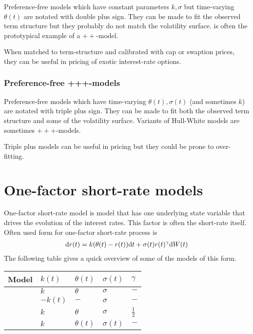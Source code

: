 Preference-free models which have constant parameters $k, \sigma$ but time-varying $\theta(t)$ are notated with double plus sign. They can be made to fit  the observed term structure but they probably do not match the volatility surface. \textcite{hull1990pricing} is often the prototypical example of a $++$-model.

When matched to term-structure and calibrated with cap or swaption prices, they can be useful in pricing of exotic interest-rate options.

\subsubsection{Preference-free +++-models}

Preference-free models which have time-varying $\theta(t), \sigma(t)$ (and sometimes $k$) are notated with triple plus sign. They can be made to fit both the observed term structure and some of the volatility surface. Variants of Hull-White models are sometimes $+++$-models. 

Triple plus models can be useful in pricing but they could be prone to over-fitting.

\section{One-factor short-rate models}

One-factor short-rate model is model that has one underlying state variable that drives the evolution of the interest rates. This factor is often the short-rate itself. Often used form for one-factor short-rate process is
\begin{align}
\mathrm{d} r (t) = k( \theta (t) - r (t) ) \mathrm{d} t + \sigma (t) r (t)^{\gamma} \mathrm{d} W (t) 
\end{align}
The following table gives a quick overview of some of the models of this form.
\begin{center}
	\begin{tabular}{|l|l|l|l|l|}
		\hline
		Model & $k(t)$ & $\theta (t)$ & $\sigma (t)$ & $\gamma$ \\
		\hline
		\hline
		\cite{vasicek1977equilibrium} & $k$ & $\theta$ & $\sigma$ & $-$ \\
		\hline
		\cite{dothan1978term} & $-k(t)$ & $-$ & $\sigma$ & $-$ \\
		\hline
		\cite{coxingersollross1985theory} & $k$ & $\theta$ & $\sigma$ & $\frac{1}{2}$ \\
		\hline
		\cite{hull1990pricing} & $k$ & $\theta (t)$ & $\sigma (t)$ & $-$ \\
		\hline
	\end{tabular}
\end{center}

